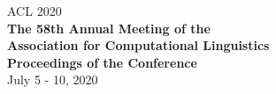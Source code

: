 \documentclass[11pt]{article}
\begin{document}
  \begin{center}
  \LARGE
  ACL 2020 \\
  \vfill
  {\bf
    The 58th Annual Meeting of the \\
    Association for Computational Linguistics\\
    \vfill
    Proceedings of the Conference\\
  }
  \vfill
  July 5 - 10, 2020
  \end{center}
\end{document}
